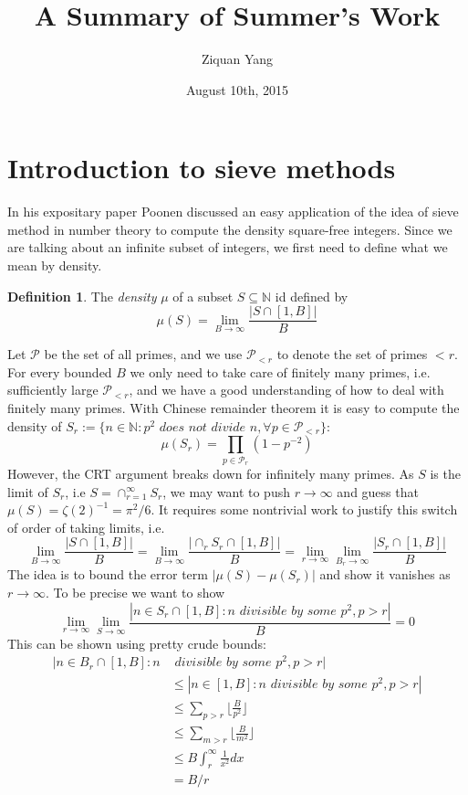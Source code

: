 \documentclass[12pt]{article}
\theoremstyle{plain}
\theoremstyle{definition}
\newtheorem{definition}[equation]{Definition}
\newcommand{\IN}{\mathbb{N}}
\newcommand{\sP}{\mathcal{P}}
\newcommand{\<}{\langle}
\renewcommand{\>}{\rangle}
\begin{document}
%

\title{A Summary of Summer's Work}
\author{Ziquan Yang}


\date{August 10th, 2015}

\maketitle


 

\setcounter{section}{0}
\section{Introduction to sieve methods}
In his expositary paper \cite{Expo} Poonen discussed an easy application of the idea of sieve method in number theory to compute the density square-free integers. Since we are talking about an infinite subset of integers, we first need to define what we mean by density. 
\begin{definition}
\label{Zdef}
The \textit{density} $\mu$ of a subset $S \subseteq \IN$ id defined by
$$\mu(S) = \lim_{B \to \infty} \frac{|S \cap [1, B]|}{B} $$
\end{definition} Let $\sP$ be the set of all primes, and we use $\sP_{<r}$ to denote the set of primes $<r$. For every bounded $B$ we only need to take care of finitely many primes, i.e. sufficiently large $\sP_{<r}$, and we have a good understanding of how to deal with finitely many primes. With Chinese remainder theorem it is easy to compute the density of $S_r := \{ n \in \IN : p^2 \textit{ does not divide } n, \forall p \in \sP_{<r} \}$: $$\mu(S_r) = \prod_{p \in \sP_r} (1 - p^{-2})$$
However, the CRT argument breaks down for infinitely many primes. As $S$ is the limit of $S_r$, i.e $S = \cap_{r = 1}^\infty S_r$, we may want to push $r \to \infty$ and guess that $\mu(S) = \zeta(2)^{-1} = \pi^2/6$. It requires some nontrivial work to justify this switch of order of taking limits, i.e. 
$$ \lim_{B \to \infty} \frac{|S \cap [1, B]|}{B} = \lim_{B \to \infty} \frac{|\cap_r S_r \cap [1, B]|}{B} = \lim_{r \to \infty} \lim_{B_r \to \infty} \frac{|S_r \cap [1, B]|}{B}$$
The idea is to bound the error term $|\mu(S) - \mu(S_r)|$ and show it vanishes as $r \to \infty$. To be precise we want to show $$\lim_{r \to \infty} \lim_{S \to \infty} \frac{|n \in S_r \cap [1, B]: n \textit{ divisible by some }p^2, p >r|}{B} = 0$$
This can be shown using pretty crude bounds:
\begin{align*} |n \in B_r \cap [1, B]: n & \textit{ divisible by some }p^2, p >r| \\ &\le |n \in [1, B]: n \textit{ divisible by some }p^2, p >r| \\ &\le \sum_{p > r} \lfloor \frac{B}{p^2} \rfloor \\
&\le \sum_{m > r} \lfloor \frac{B}{m^2} \rfloor \\
&\le B \int_r^\infty \frac{1}{x^2} dx \\
&= B/r
\end{align*}
\end{document}
